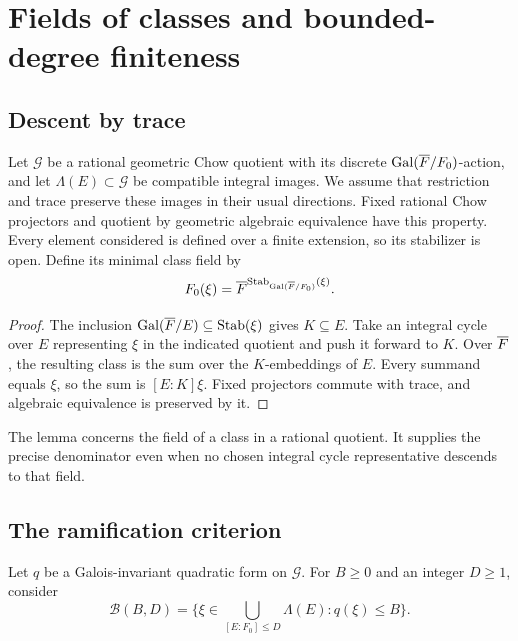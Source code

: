 \documentclass[11pt,a4paper]{article}
\newtheorem{lemma}[theorem]{Lemma}
\theoremstyle{definition}
\numberwithin{equation}{section}
\begin{document}
\section{Fields of classes and bounded-degree finiteness}\label{sec:fields}

\subsection{Descent by trace}\label{sec:class-fields}

Let \(\mathcal G\) be a rational geometric Chow quotient with its
discrete \(\operatorname{Gal}(\overline F/F_0)\)-action, and let \(\Lambda(E)\subset\mathcal G\)
be compatible integral images. We assume that restriction and trace
preserve these images in their usual directions. Fixed rational Chow
projectors and quotient by geometric algebraic equivalence have this
property. Every element considered is defined over a finite extension,
so its stabilizer is open. Define its minimal class field by
\[
 F_0(\xi)=\overline F^{\operatorname{Stab}_{\operatorname{Gal}(\overline F/F_0)}(\xi)}.
\]


\begin{proof}
The inclusion \(\operatorname{Gal}(\overline F/E)\subseteq\operatorname{Stab}(\xi)\) gives
\(K\subseteq E\). Take an integral cycle over \(E\) representing
\(\xi\) in the indicated quotient and push it forward to \(K\).
Over \(\overline F\), the resulting class is the sum over the
\(K\)-embeddings of \(E\). Every summand equals \(\xi\), so
the sum is \([E:K]\xi\). Fixed projectors commute with trace,
and algebraic equivalence is preserved by it.
\end{proof}

The lemma concerns the field of a class in a rational quotient.
It supplies the precise denominator even when no chosen integral
cycle representative descends to that field.

\subsection{The ramification criterion}\label{sec:ramification-proof}

Let \(q\) be a Galois-invariant quadratic form on \(\mathcal G\).
For \(B\ge0\) and an integer \(D\ge1\), consider
\[
 \mathcal B(B,D)=
 \{\xi\in\bigcup_{[E:F_0]\le D}\Lambda(E):q(\xi)\le B\}.
\]
\end{document}
